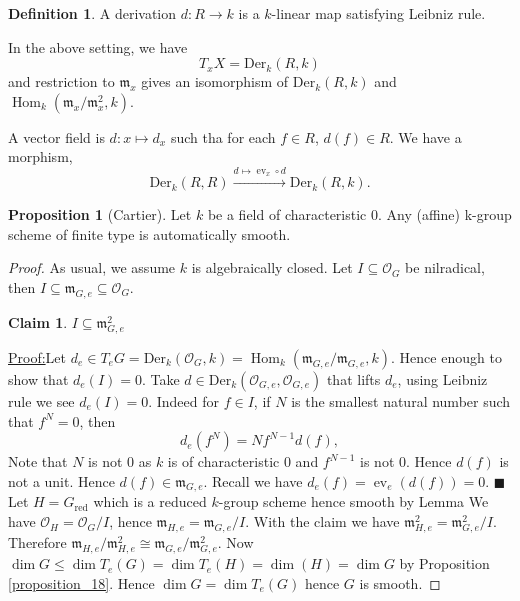 \documentclass[10pt]{article}
\numberwithin{equation}{section}
\theoremstyle{definition}
\newtheorem{proposition}{Proposition}[section]
\newtheorem{definition}{Definition}[section]
\newtheorem{claim}{Claim}
\newenvironment{claimproof}[1]{\par\noindent\underline{Proof:}\space#1}{\hfill $\blacksquare$}
\DeclareMathOperator{\ev}{ev}
\DeclareMathOperator{\Hom}{Hom}
\newcommand{\m}[0]{\mathfrak{m}}
\newcommand{\cO}[0]{\mathcal{O}}
\begin{document}
\begin{definition}
    A derivation $d:R\to k$ is a $k$-linear map satisfying Leibniz rule. 
\end{definition}
In the above setting, we have 
\begin{equation*}
    T_xX = \mathrm{Der}_k(R,k)
\end{equation*}
and restriction to $\m_x$ gives an isomorphism of $\mathrm{Der}_k(R,k)$ and $\Hom_k(\m_x/\m_x^2,k)$.
\par A vector field is $d:x\mapsto d_x$ such tha for each $f\in R$, $d(f)\in R$. We have a morphism,
\begin{equation*}
    \mathrm{Der}_k(R,R)\stackrel{d\mapsto \ev_x\circ d}{\to}\mathrm{Der}_k(R,k).
\end{equation*}
\begin{proposition}[Cartier]
    Let $k$ be a field of characteristic $0$. Any (affine) k-group scheme of finite type is automatically smooth.
\end{proposition}
\begin{proof}
    As usual, we assume $k$ is algebraically closed. Let $I\subseteq\cO_G$ be nilradical, then $I\subseteq\m_{G,e}\subseteq\cO_G$.
    \begin{claim}
    $I\subseteq\m_{G,e}^2$
    \end{claim}
    \begin{claimproof}
        Let $d_e\in T_eG=\mathrm{Der}_k(\cO_G,k)=\Hom_k(\m_{G,e}/\m_{G,e},k)$. Hence enough to show that $d_e(I) = 0$. Take $d\in\mathrm{Der}_k(\cO_{G,e},\cO_{G,e})$ that lifts $d_e$, using Leibniz rule we see $d_e(I)=0$. Indeed for $f\in I$, if $N$ is the smallest natural number such that $f^N = 0$, then 
        \begin{equation*}
            d_e(f^N) = Nf^{N-1}d(f),
        \end{equation*}
        Note that $N$ is not $0$ as $k$ is of characteristic $0$ and $f^{N-1}$ is not $0$. Hence $d(f)$ is not a unit. Hence $d(f)\in\m_{G,e}$. Recall we have $d_e(f) = \ev_e(d(f))=0$. 
    \end{claimproof}
    Let $H=G_{\mathrm{red}}$ which is a reduced $k$-group scheme hence smooth by Lemma %
    We have $\cO_H=\cO_G/I$, hence $\m_{H,e} = \m_{G,e}/I$. With the claim we have $\m_{H,e}^2 = \m_{G,e}^2/I$. Therefore $\m_{H,e}/\m_{H,e}^2\cong \m_{G,e}/\m_{G,e}^2$. Now $\dim G\leq \dim T_e(G)=\dim T_e(H) = \dim(H)=\dim G$ by Proposition \ref{proposition_18}. Hence $\dim G = \dim T_e(G)$ hence $G$ is smooth.
\end{proof}
\end{document}
